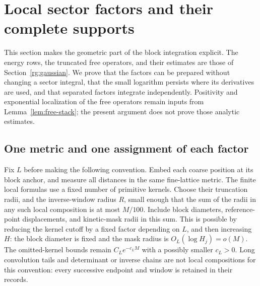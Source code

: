 \section{Local sector factors and their complete supports}
\label{app:rg-geometry}

This section makes the geometric part of the block integration explicit.
The energy rows, the truncated free operators, and their estimates are
those of Section~\ref{rg:gaussian}.  We prove that the factors can be
prepared without changing a sector integral, that the small logarithm
persists where its derivatives are used, and that separated factors
integrate independently.  Positivity and exponential localization of the
free operators remain inputs from Lemma~\ref{lem:free-stack}; the present
argument does not prove those analytic estimates.

\subsection{One metric and one assignment of each factor}
\label{app:factor-ownership}

Fix $L$ before making the following convention.  Embed each coarse
position at its block anchor, and measure all distances in the same
fine-lattice metric.  The finite local formulas use a fixed number of
primitive kernels.  Choose their truncation radii, and the inverse-window
radius $R$, small enough that the sum of the radii in any such local
composition is at most $M/100$.  Include block diameters, reference-point
displacements, and kinetic-mask radii in this sum.  This is possible by
reducing the kernel cutoff by a fixed factor depending on $L$, and then
increasing $H$: the block diameter is fixed and the mask radius is
$O_L(\log H_j)=o(M)$.  The omitted-kernel bounds remain
$C_Le^{-c_LM}$ with a possibly smaller $c_L>0$.  Long convolution tails
and determinant or inverse chains are not local compositions for this
convention: every successive endpoint and window is retained in their
records.

